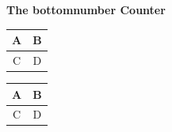 \documentclass{article}
\begin{document}
	{\centering \huge \bf The bottomnumber Counter}
	\vspace{0.5cm}
	
	\kant[1]
	
	\begin{table}[b]
		\begin{tabular}{|c|c|}
			\hline A & B \\ \hline C & D \\ \hline
		\end{tabular}
	\end{table}
	
	\begin{table}[b]
		\begin{tabular}{|c|c|}
			\hline A & B \\ \hline C & D \\ \hline
		\end{tabular}
	\end{table}
\end{document}
